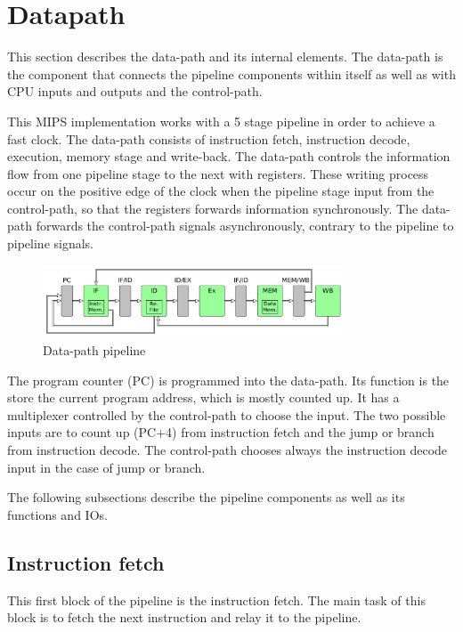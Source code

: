 \section{Datapath}
This section describes the data-path and its internal elements. The data-path is the component that connects the pipeline components within itself as well as with CPU inputs and outputs and the control-path.

This MIPS implementation works with a 5 stage pipeline in order to achieve a fast clock. The data-path consists of instruction fetch, instruction decode, execution, memory stage and write-back.
The data-path controls the information flow from one pipeline stage to the next with registers. 
These writing process occur on the positive edge of the clock when the pipeline stage input from the control-path, so that the registers forwards information synchronously. 
The data-path forwards the control-path signals asynchronously, contrary to the pipeline to pipeline signals.



\begin{figure}[h!]
  \centering
  \includegraphics[width=0.8\textwidth]{figure/datapath.png}
  \caption{Data-path pipeline}
  \label{fig:datapath}
\end{figure}

The program counter (PC) is programmed into the data-path. Its function is the store the current program address, which is mostly counted up.
It has a multiplexer controlled by the control-path to choose the input. The two possible inputs are to count up (PC+4) from instruction fetch
and the jump or branch from instruction decode. The control-path chooses always the instruction decode input in the case of jump or branch. 


The following subsections describe the pipeline components as well as its functions and IOs. 

\subsection{Instruction fetch}
This first block of the pipeline is the instruction fetch. The main task of this block is to fetch the next instruction and relay it to the pipeline. 

